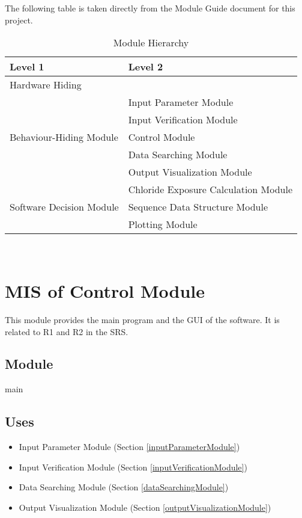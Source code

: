 \documentclass[12pt, titlepage]{article}
\begin{document}
The following table is taken directly from the Module Guide document for this project.

\begin{table}[h!]
\centering
\begin{tabular}{p{} p{}}
\toprule
\textbf{Level 1} & \textbf{Level 2}\\
\midrule

{Hardware Hiding} & ~ \\
\midrule

\multirow{5}{0.3\textwidth}{Behaviour-Hiding Module} & Input Parameter Module\\
& Input Verification Module\\
& Control Module\\
& Data Searching Module\\
& Output Visualization Module\\

\midrule

\multirow{3}{0.3\textwidth}{Software Decision Module} & Chloride Exposure Calculation Module \\
& Sequence Data Structure Module \\
& Plotting Module \\
\bottomrule

\end{tabular}
\caption{Module Hierarchy}
\label{TblMH}
\end{table}

\newpage
~\newpage

\section{MIS of Control Module} \label{controlModule} 
This module provides the main program and the GUI of the software. It is related to R1 and R2 in the SRS.


\subsection{Module}

main

\subsection{Uses}
\begin{itemize}
\item Input Parameter Module (Section \ref{inputParameterModule})
\item Input Verification Module (Section \ref{inputVerificationModule})
\item Data Searching Module (Section \ref{dataSearchingModule})
\item Output Visualization Module (Section \ref{outputVisualizationModule})
\end{itemize}
\end{document}
